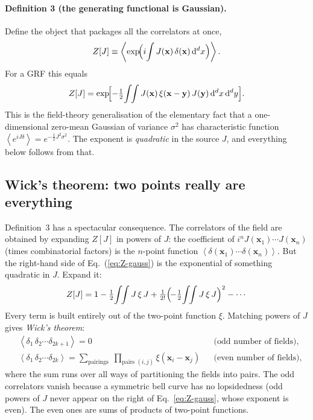 \documentclass[12pt]{article}
\newcommand{\bx}{\mathbf{x}}
\newcommand{\by}{\mathbf{y}}
\newcommand{\avg}[1]{\left\langle #1 \right\rangle}
\begin{document}
\paragraph{Definition 3 (the generating functional is Gaussian).}
Define the object that packages all the correlators at once,
\begin{equation}
  Z[J] \equiv \avg{\exp\!\Bigl(i\!\int J(\bx)\,\delta(\bx)\,\mathrm d^d x\Bigr)}.
  \label{eq:Z}
\end{equation}
For a GRF this equals
\begin{equation}
  Z[J] = \exp\!\Bigl[-\tfrac12\!\int\!\!\int J(\bx)\,\xi(\bx-\by)\,J(\by)\,
          \mathrm d^d x\,\mathrm d^d y\Bigr].
  \label{eq:Z-gauss}
\end{equation}
This is the field-theory generalisation of the elementary fact that a
one-dimensional zero-mean Gaussian of variance $\sigma^2$ has
characteristic function $\avg{e^{iJ\delta}} = e^{-\frac12 J^2\sigma^2}$.
The exponent is \emph{quadratic} in the source $J$, and everything below
follows from that.

\subsection{Wick's theorem: two points really are everything}
\label{sec:wick}

Definition~3 has a spectacular consequence.  The correlators of the
field are obtained by expanding $Z[J]$ in powers of $J$: the coefficient
of $i^n J(\bx_1)\cdots J(\bx_n)$ (times combinatorial factors) is the
$n$-point function $\avg{\delta(\bx_1)\cdots\delta(\bx_n)}$.  But the
right-hand side of Eq.~(\ref{eq:Z-gauss}) is the exponential of something
quadratic in $J$.  Expand it:
\begin{equation}
  Z[J] = 1 - \tfrac12\!\int\!\!\int J\,\xi\,J
         + \tfrac{1}{2!}\Bigl(\!-\tfrac12\!\int\!\!\int J\,\xi\,J\Bigr)^2
         - \cdots
\end{equation}
Every term is built entirely out of the two-point function $\xi$.
Matching powers of $J$ gives \emph{Wick's theorem}:
\begin{align}
  &\avg{\delta_1\,\delta_2\cdots\delta_{2k+1}} = 0
     &&\text{(odd number of fields),}
     \label{eq:wick-odd}\\[4pt]
  &\avg{\delta_1\,\delta_2\cdots\delta_{2k}}
     = \sum_{\text{pairings}}\;\prod_{\text{pairs }(i,j)} \xi(\bx_i - \bx_j)
     &&\text{(even number of fields),}
     \label{eq:wick-even}
\end{align}
where the sum runs over all ways of partitioning the fields into pairs.
The odd correlators vanish because a symmetric bell curve has no
lopsidedness (odd powers of $J$ never appear on the right of
Eq.~\ref{eq:Z-gauss}, whose exponent is even).  The even ones are sums
of products of two-point functions.
\end{document}
